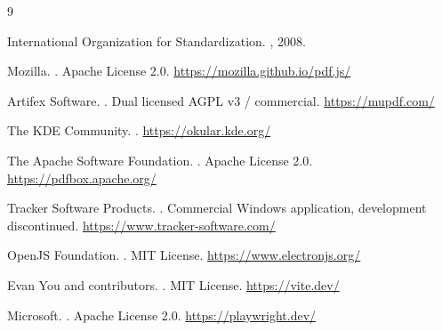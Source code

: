 \begin{thebibliography}{9}
\small
\setlength{\itemsep}{1pt}

International Organization for Standardization.
, 2008.

Mozilla.
.
\newblock Apache License 2.0. \url{https://mozilla.github.io/pdf.js/}

Artifex Software.
.
\newblock Dual licensed AGPL v3 / commercial. \url{https://mupdf.com/}

The KDE Community.
.
\newblock \url{https://okular.kde.org/}

The Apache Software Foundation.
.
\newblock Apache License 2.0. \url{https://pdfbox.apache.org/}

Tracker Software Products.
.
\newblock Commercial Windows application, development discontinued.
\newblock \url{https://www.tracker-software.com/}

OpenJS Foundation.
.
\newblock MIT License. \url{https://www.electronjs.org/}

Evan You and contributors.
.
\newblock MIT License. \url{https://vite.dev/}

Microsoft.
.
\newblock Apache License 2.0. \url{https://playwright.dev/}

\end{thebibliography}
